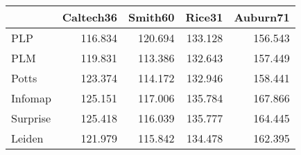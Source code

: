 \begin{tabular}{lrrrr}
\toprule
{} & Caltech36 & Smith60 &  Rice31 & Auburn71 \\
\midrule
PLP      &   116.834 & 120.694 & 133.128 &  156.543 \\
PLM      &   119.831 & 113.386 & 132.643 &  157.449 \\
Potts    &   123.374 & 114.172 & 132.946 &  158.441 \\
Infomap  &   125.151 & 117.006 & 135.784 &  167.866 \\
Surprise &   125.418 & 116.039 & 135.777 &  164.445 \\
Leiden   &   121.979 & 115.842 & 134.478 &  162.395 \\
\bottomrule
\end{tabular}
